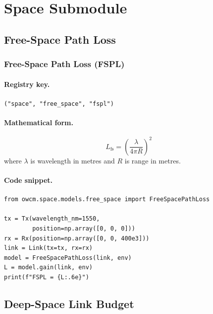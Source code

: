 \documentclass[11pt,a4paper]{article}
\begin{document}
\section{Space Submodule}

\subsection{Free-Space Path Loss}

\subsubsection{Free-Space Path Loss (FSPL)}
\label{sec:fspl}

\paragraph{Registry key.} \texttt{("space", "free\_space", "fspl")}

\paragraph{Mathematical form.}
\begin{equation}
\boxed{L_{\text{fs}} = \left(\frac{\lambda}{4\pi R}\right)^2}
\end{equation}
where $\lambda$ is wavelength in metres and $R$ is range in metres.

\paragraph{Code snippet.}
\begin{lstlisting}
from owcm.space.models.free_space import FreeSpacePathLoss

tx = Tx(wavelength_nm=1550,
        position=np.array([0, 0, 0]))
rx = Rx(position=np.array([0, 0, 400e3]))
link = Link(tx=tx, rx=rx)
model = FreeSpacePathLoss(link, env)
L = model.gain(link, env)
print(f"FSPL = {L:.6e}")
\end{lstlisting}

\subsection{Deep-Space Link Budget}
\end{document}
